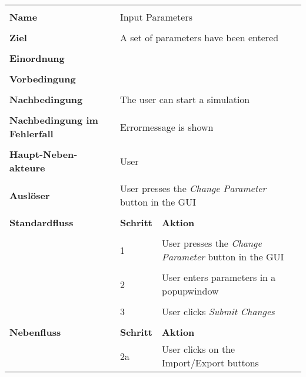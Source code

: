 {\begin{tabular}{|p{5cm}|p{2cm}|p{3cm}|}
\hline \\
\textbf{Name} & \multicolumn{2}{p{5cm}|}{Input Parameters} \\
\hline \\
\textbf{Ziel} & \multicolumn{2}{p{5cm}|}{A set of parameters have been entered} \\
\hline \\
\textbf{Einordnung} & \multicolumn{2}{p{5cm}|}{} \\
\hline \\
\textbf{Vorbedingung} & \multicolumn{2}{p{5cm}|}{} \\
\hline \\
\textbf{Nachbedingung} & \multicolumn{2}{p{5cm}|}{The user can start a simulation} \\
\hline \\
\textbf{Nachbedingung im Fehlerfall} & \multicolumn{2}{p{5cm}|}{Errormessage is shown}\\
\hline \\
\textbf{Haupt-Neben-akteure} & \multicolumn{2}{p{5cm}|}{User} \\
\hline \\
\textbf{Ausl\"oser} & \multicolumn{2}{p{5cm}|}{User presses the \textit{Change Parameter} button in the GUI} \\
\hline \\
\textbf{Standardfluss} & \textbf{Schritt}& \textbf{Aktion} \\
\hline \\
& 1 & User presses the \textit{Change Parameter} button in the GUI \\
\hline \\
& 2 & User enters parameters in a popupwindow \\
\hline \\
& 3 & User clicks \textit{Submit Changes}\\
\hline \\
\textbf{Nebenfluss} & \textbf{Schritt} & \textbf{Aktion} \\
& 2a & User clicks on the Import/Export buttons\\
\hline
\end{tabular}

}
